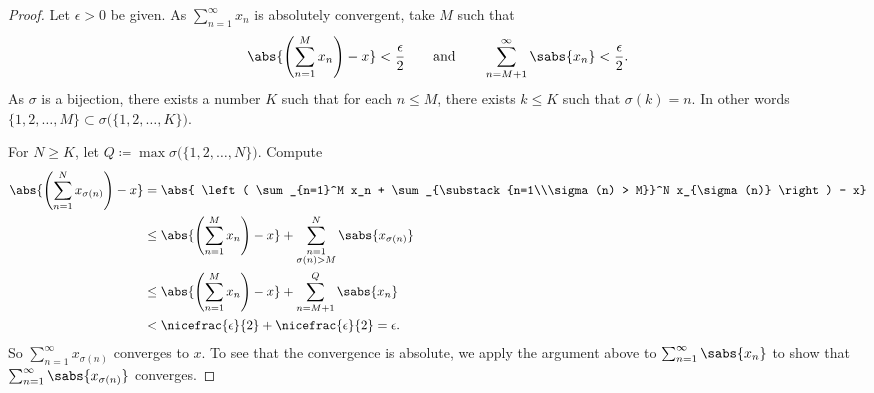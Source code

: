 \begin{proof}
Let $\epsilon > 0$ be given.  As $\sum_{n=1}^\infty x_n$ is absolutely convergent, take $M$ such that
\begin{equation*}
\abs{\left(\sum_{n=1}^M x_n \right) - x} < \frac{\epsilon}{2}
\qquad \text{and} \qquad
\sum_{n=M+1}^\infty \sabs{x_n} < \frac{\epsilon}{2} .
\end{equation*}
As $\sigma$ is a bijection,
there exists a number $K$ such that for each
$n \leq M$, there exists $k \leq K$ such that $\sigma(k) = n$.
In other words
$\{ 1,2,\ldots,M \} \subset \sigma\bigl(\{ 1,2,\ldots,K \} \bigr)$.

For $N \geq K$, let $Q \coloneqq \max \sigma\bigl(\{ 1,2,\ldots,N \}\bigr)$.
Compute
\begin{equation*}
\begin{split}
\abs{\left( \sum_{n=1}^N x_{\sigma(n)} \right) - x}
& =
\abs{ \left( \sum_{n=1}^M x_n
+
\sum_{\substack{n=1\\\sigma(n) > M}}^N x_{\sigma(n)} \right) - x}
\\
& \leq
\abs{ \left( \sum_{n=1}^M x_n \right) - x}
+
\sum_{\substack{n=1\\\sigma(n) > M}}^N \sabs{x_{\sigma(n)}}
\\
& \leq
\abs{ \left( \sum_{n=1}^M x_n \right) - x}
+
\sum_{n=M+1}^Q \sabs{x_{n}}
\\
& < \nicefrac{\epsilon}{2} + \nicefrac{\epsilon}{2} = \epsilon .
\end{split}
\end{equation*}
So 
$\sum_{n=1}^\infty x_{\sigma(n)}$ converges to $x$.  To see that the convergence
is absolute, we apply the argument above to $\sum_{n=1}^\infty \sabs{x_n}$ to show
that $\sum_{n=1}^\infty \sabs{x_{\sigma(n)}}$ converges.
\end{proof}

